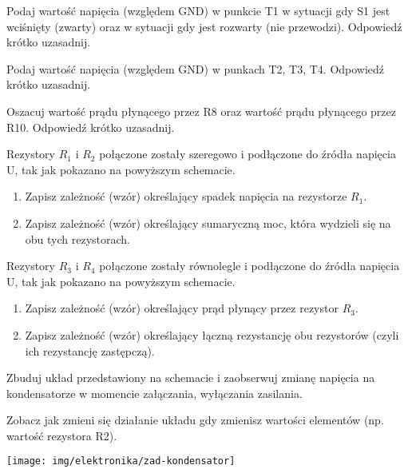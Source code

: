 \dbEntryCheckResults
Podaj wartość napięcia (względem GND) w punkcie T1 w sytuacji gdy S1 jest wciśnięty (zwarty) oraz w sytuacji gdy jest rozwarty (nie przewodzi). Odpowiedź krótko uzasadnij.
\fi

\dbEntryCheckResults
Podaj wartość napięcia (względem GND) w punkach T2, T3, T4. Odpowiedź krótko uzasadnij.
\fi

\dbEntryCheckResults
Oszacuj wartość prądu płynącego przez R8 oraz wartość prądu płynącego przez R10. Odpowiedź krótko uzasadnij.
\fi

\dbEntryCheckResults
  Rezystory $R_1$ i $R_2$ połączone zostały szeregowo i podłączone do źródła napięcia U, tak jak pokazano na powyższym schemacie.
  \begin{enumerate}[label=\alph*)]
    \item Zapisz zależność (wzór) określający spadek napięcia na rezystorze $R_1$.
    \item Zapisz zależność (wzór) określający sumaryczną moc, która wydzieli się na obu tych rezystorach.
  \end{enumerate}
\fi

\dbEntryCheckResults
  Rezystory $R_3$ i $R_4$ połączone zostały równolegle i podłączone do źródła napięcia U, tak jak pokazano na powyższym schemacie.
  \begin{enumerate}[label=\alph*)]
    \item Zapisz zależność (wzór) określający prąd płynący przez rezystor $R_3$.
    \item Zapisz zależność (wzór) określający łączną rezystancję obu rezystorów (czyli ich rezystancję zastępczą).
  \end{enumerate}
\fi

%
%

\dbEntryCheckResults
\noindent\begin{minipage}[b]{0.55\textwidth}
Zbuduj układ przedstawiony na schemacie i zaobserwuj zmianę napięcia na kondensatorze w momencie załączania, wyłączania zasilania.

\vspace{13pt}

Zobacz jak zmieni się działanie układu gdy zmienisz wartości elementów (np. wartość rezystora R2).

\ifdefined\ladowanieKondensatoraWartosci\vspace{13pt}\ladowanieKondensatoraWartosci\fi
\end{minipage}
\hfill
\begin{minipage}[b]{0.4\textwidth}
\texttt{[image: img/elektronika/zad-kondensator]}
\end{minipage}
\fi


